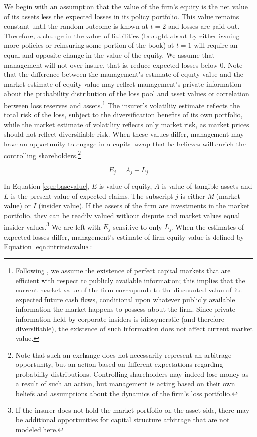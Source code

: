 We begin with an assumption that the value of the firm's equity is the net value of its assets less the expected losses in its policy portfolio.  This value remains constant until the random outcome is known at $t=2$ and losses are paid out.  Therefore, a change in the value of liabilities (brought about by either issuing more policies or reinsuring some portion of the book) at $t=1$ will require an equal and opposite change in the value of the equity. We assume that management will not over-insure, that is, reduce expected losses below 0. Note that the difference between the management's estimate of equity value and the market estimate of equity value may reflect management's private information about the probability distribution of the loss pool and asset values or correlation between loss reserves and assets.\footnote{Following \citet{myers1984a}, we assume the existence of perfect capital markets that are efficient with respect to publicly available information; this implies that the current market value of the firm corresponds to the discounted value of its expected future cash flows, conditional upon whatever publicly available information the market happens to possess about the firm. Since private information held by corporate insiders is idiosyncratic (and therefore diversifiable), the existence of such information does not affect current market value.}  The insurer's volatility estimate reflects the total risk of the loss, subject to the diversification benefits of its own portfolio, while the market estimate of volatility reflects only market risk, as market prices should not reflect diversifiable risk. When these values differ, management may have an opportunity to engage in a capital swap that he believes will enrich the controlling shareholders.\footnote{Note that such an exchange does not necessarily represent an arbitrage opportunity, but an action based on different expectations regarding probability distributions.  Controlling shareholders may indeed lose money as a result of such an action, but management is acting based on their own beliefs and assumptions about the dynamics of the firm's loss portfolio.}

\begin{equation}\label{eqn:basevalue}
E_j=A_j-L_j
\end{equation}

In Equation \ref{eqn:basevalue}, $E$ is value of equity, $A$ is value of tangible assets and $L$ is the present value of expected claims. The subscript $j$ is either $M$ (market value) or $I$ (insider value).  If the assets of the firm are investments in the market portfolio, they can be readily valued without dispute and market values equal insider values.\footnote{If the insurer does not hold the market portfolio on the asset side, there may be additional opportunities for capital structure arbitrage that are not modeled here.} We are left with $E_j$ sensitive to only $L_j$. When the estimates of expected losses differ, management's estimate of firm equity value is defined by Equation \ref{eqn:intrinsicvalue}:

